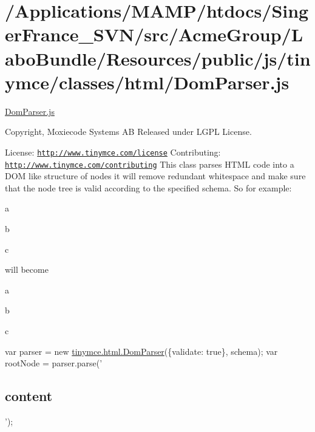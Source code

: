 \hypertarget{_2_applications_2_m_a_m_p_2htdocs_2_singer_france__s_v_n_2src_2_acme_group_2_labo_bundle_2_resoufac8934c3679d076175cf964af95d5d6}{\section{/\+Applications/\+M\+A\+M\+P/htdocs/\+Singer\+France\+\_\+\+S\+V\+N/src/\+Acme\+Group/\+Labo\+Bundle/\+Resources/public/js/tinymce/classes/html/\+Dom\+Parser.\+js}
}
\hyperlink{_dom_parser_8js}{Dom\+Parser.\+js}

Copyright, Moxiecode Systems A\+B Released under L\+G\+P\+L License.

License\+: \href{http://www.tinymce.com/license}{\tt http\+://www.\+tinymce.\+com/license} Contributing\+: \href{http://www.tinymce.com/contributing}{\tt http\+://www.\+tinymce.\+com/contributing} This class parses H\+T\+M\+L code into a D\+O\+M like structure of nodes it will remove redundant whitespace and make sure that the node tree is valid according to the specified schema. So for example\+: 

a

b

c

will become 

a

b

c

var parser = new \hyperlink{classtinymce_1_1html_1_1_dom_parser}{tinymce.\+html.\+Dom\+Parser}(\{validate\+: true\}, schema); var root\+Node = parser.\+parse('\subsection*{content}

');


\begin{DoxyCodeInclude}
\end{DoxyCodeInclude}
 